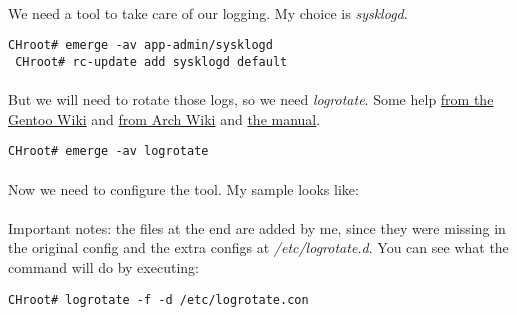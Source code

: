\documentclass[10pt,a4paper]{article}
\begin{document}
                    \paragraph{} We need a tool to take care of our logging. My choice is \textit{sysklogd}.
                    
                    \begin{lstlisting}[style=BashInputCHRoot]
 CHroot# emerge -av app-admin/sysklogd
 CHroot# rc-update add sysklogd default
                    \end{lstlisting}
                    
                    \paragraph{} But we will need to rotate those logs, so we need \textit{logrotate}. Some help \href{https://wiki.gentoo.org/wiki/Logrotate}{from the Gentoo Wiki} and \href{https://wiki.archlinux.org/index.php/logrotate}{from Arch Wiki} and \href{https://linuxconfig.org/logrotate-8-manual-page}{the manual}.
                    
                    \begin{lstlisting}[style=BashInputCHRoot]
 CHroot# emerge -av logrotate
                    \end{lstlisting}
                    
                    \paragraph{} Now we need to configure the tool. My sample looks like:
                    

                    
                    \paragraph{} Important notes: the files at the end are added by me, since they were missing in the original config and the extra configs at \textit{/etc/logrotate.d}. You can see what the command will do by executing:
                    
                    \begin{lstlisting}[style=BashInputCHRoot]
 CHroot# logrotate -f -d /etc/logrotate.con
                    \end{lstlisting}
                    
\end{document}
